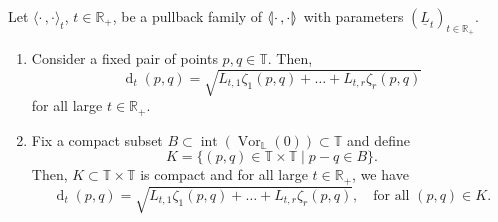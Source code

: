 \documentclass[AHL,Unicode,longabstracts]{cedram}
\newcommand{\innone}[2]{{\langle#2\rangle_{#1}}}
\newcommand{\llangle}{\mathopen{\langle\mkern -3.1mu\lvert}}
\newcommand{\rrangle}{\mathclose{\rvert\mkern -3.1mu\rangle}}
\newcommand{\highinn}[2]{{\llangle#2\rrangle_{#1}}}
\DeclareMathOperator{\Vor}{Vor}
\DeclareMathOperator{\intt}{int}
\DeclareMathOperator{\dist}{d}
\newcommand{\R}{\mathbb{R}}
\newcommand{\T}{\mathbb{T}}
\renewcommand{\L}{\mathbb{L}}
\newcommand{\dtor}{\zeta}
\newcommand{\interior}[1]{\intt(#1)}
\newcommand*{\relabel}{\renewcommand{\labelenumi}{(\theenumi)}}
\newcommand*{\romanenumi}{\renewcommand*{\theenumi}{\roman{enumi}}\relabel}
\begin{document}
\begin{theo}\label{thm:metric-asymptotics-pullback}
Let $\innone{t}{\cdot\,, \cdot}$, $t \in \R_+$, be a pullback family of $\highinn{}{\cdot\,, \cdot}$ with parameters $(\underline L_t)_{t \in \R_+}$.
\begin{enumerate}\romanenumi
\item\label{theo9.6.1} Consider a fixed pair of points $p,q \in \T$. Then,
\begin{equation}\label{eq:EqualityHigherRankMetric}
\dist_t(p,q) = \sqrt{L_{t,1} \dtor_1(p,q) + \dots + L_{t,r} \dtor_r(p,q)}
\end{equation}
for all large $t \in \R_+$.
\item\label{theo9.6.2} Fix a compact subset $B \subset \interior{\Vor_\L(0)} \subset \T$ and define 
\[
K = \{(p,q) \in \T\times \T \mid p-q \in B \}.
\]
Then, $K \subset \T \times \T$ is compact and for all large $t \in \R_+$, we have
\begin{equation}\label{eq:EqualityHigherRankMetric2}
\dist_t(p,q) = \sqrt{L_{t,1} \dtor_1(p,q) + \dots + L_{t,r} \dtor_r(p,q)}, \quad \text{for all } (p,q) \in K.
\end{equation}
\end{enumerate}
\end{theo}
\end{document}
